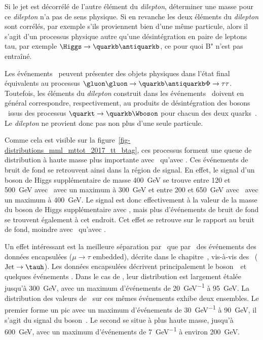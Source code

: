Si le jet est décorrélé de l'autre élément du \emph{dilepton},
déterminer une masse pour ce \emph{dilepton} n'a pas de sens physique.
Si en revanche les deux éléments du \emph{dilepton} sont corrélés,
par exemple s'ils proviennent bien d'une même particule,
alors il s'agit d'un processus physique autre qu'une désintégration en paire de leptons tau,
par exemple $\Higgs\to\quarkb\antiquarkb$,
ce pour quoi B" n'est pas entraîné.
\par
Les événements \ttbar\ peuvent présenter des objets physiques dans l'état final équivalents
au processus $\gluon\gluon\to\quarkb\antiquarkb\Phi\to\tau\tau$.
Toutefois, les éléments du \emph{dilepton} construit dans les événements \ttbar\
doivent en général correspondre, respectivement, au produits de désintégration des bosons \Wboson\ issus des processus
$\quarkt\to\quarkb\Wboson$ pour chacun des deux quarks~\quarkt.
Le \emph{dilepton} ne provient donc pas non plus d'une seule particule.
\par
Comme cela est visible sur la figure~\ref{fig-distributions_mml_mttot_2017_tt_btag},
ces processus forment une queue de distribution à haute masse plus importante avec \mml\ qu'avec \mTtot.
Ces événements de bruit de fond se retrouvent ainsi dans la région de signal.
En effet, le signal d'un boson de Higgs supplémentaire de masse \SI{400}{\GeV} se trouve
entre \num{120} et \SI{500}{\GeV} avec \mTtot\
avec un maximum à \SI{300}{\GeV}
et
entre \num{200} et \SI{650}{\GeV} avec \mml\
avec un maximum à \SI{400}{\GeV}.
Le signal est donc effectivement à la valeur de la masse du boson de Higgs supplémentaire avec \mml,
mais plus d'événements de bruit de fond se trouvent également à cet endroit.
Cet effet se retrouve sur le rapport au bruit de fond, moindre avec \mml\ qu'avec \mTtot.
\par
Un effet intéressant est la meilleure séparation par \mml\ que par \mTtot\ des événements
des données encapsulées ($\mu\to\tau$ embedded), décrite dans le chapitre~\refChHTT,
vis-à-vis des \ftauhs\ ($\text{Jet}\to\tauh$).
Les données encapsulées décrivent principalement le boson~\Zboson\ et quelques événements \ttbar.
Dans le cas de \mTtot,
leur distribution est 
largement étalée
jusqu'à \SI{300}{\GeV},
avec un maximum d'événements de \SI{20}{\GeV^{-1}} à \SI{95}{\GeV}.
La distribution des valeurs de \mml\ sur ces mêmes événements
exhibe deux ensembles.
Le premier forme un pic
avec un maximum d'événements de \SI{30}{\GeV^{-1}} à \SI{90}{\GeV},
il s'agit du signal du boson~\Zboson.
Le second se situe à plus haute masse,
jusqu'à \SI{600}{\GeV},
avec un maximum d'événements de \SI{7}{\GeV^{-1}} à environ \SI{200}{\GeV}.
